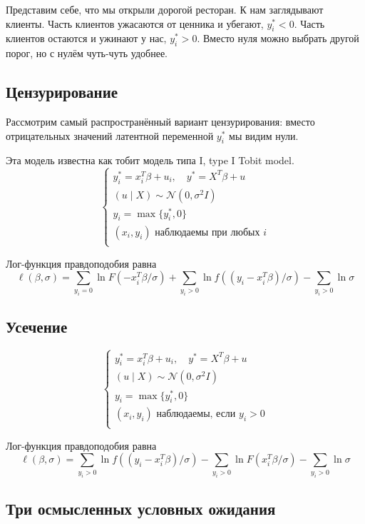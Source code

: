 \documentclass[12pt]{article}
\newcommand{\cN}{\mathcal{N}}
\begin{document}
Представим себе, что мы открыли дорогой ресторан. 
К нам заглядывают клиенты. 
Часть клиентов ужасаются от ценника и убегают, $y_i^* < 0$.
Часть клиентов остаются и ужинают у нас, $y_i^* > 0$.
Вместо нуля можно выбрать другой порог, но с нулём чуть-чуть удобнее. 


\subsection{Цензурирование}

Рассмотрим самый распространённый вариант цензурирования: вместо отрицательных значений латентной переменной $y_i^*$ мы видим нули.

Эта модель известна как тобит модель типа I, type I Tobit model. 
\[
\begin{cases}
    y_i^* = x_i^T \beta + u_i, \quad y^* = X^T \beta + u \\
    (u \mid X) \sim \cN(0, \sigma^2 I) \\
    y_i = \max\{y_i^*, 0\} \\
    (x_i, y_i) \text{ наблюдаемы при любых }i \\
\end{cases}
\]

Лог-функция правдоподобия равна
\[
\ell(\beta, \sigma) = \sum_{y_i = 0} {\ln F(-x_i^T \beta / \sigma)} + \sum_{y_i > 0} {\ln f((y_i-x_i^T\beta) / \sigma)} - \sum_{y_i > 0} \ln \sigma
\]


\subsection{Усечение}

\[
\begin{cases}
    y_i^* = x_i^T \beta + u_i, \quad y^* = X^T \beta + u \\
    (u \mid X) \sim \cN(0, \sigma^2 I) \\
    y_i = \max\{y_i^*, 0\} \\
    (x_i, y_i) \text{ наблюдаемы, если } y_i > 0 \\
\end{cases}
\]

Лог-функция правдоподобия равна
\[
\ell(\beta, \sigma) = \sum_{y_i > 0} {\ln f((y_i-x_i^T\beta) / \sigma)} - \sum_{y_i > 0}{\ln F(x_i^T \beta / \sigma)} - \sum_{y_i > 0} \ln \sigma
\]


\subsection{Три осмысленных условных ожидания}
\end{document}

